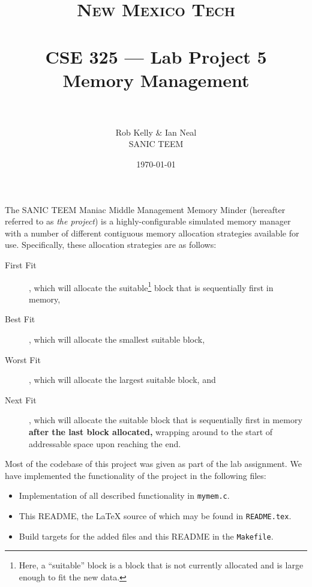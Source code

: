 \documentclass[paper=a4, fontsize=11pt]{scrartcl}
\title{
  \normalfont \normalsize 
  \textsc{New Mexico Tech} \\ [25pt]
  \horrule{0.5pt} \\[0.4cm]
  \huge CSE 325 --- Lab Project 5 \\ Memory Management \\
  \horrule{2pt} \\[0.5cm]
}
\author{Rob Kelly \& Ian Neal \\ SANIC TEEM}
\date{\normalsize\today}
\begin{document}
\maketitle

The SANIC TEEM Maniac Middle Management Memory Minder (hereafter referred to as \textit{the project}) is a highly-configurable simulated memory manager with a number of different contiguous memory allocation strategies available for use. Specifically, these allocation strategies are as follows:

\begin{description}
  \item[First Fit], which will allocate the suitable\footnote{Here, a ``suitable'' block is a block that is not currently allocated and is large enough to fit the new data.} block that is sequentially first in memory,

  \item[Best Fit], which will allocate the smallest suitable block,

  \item[Worst Fit], which will allocate the largest suitable block, and

  \item[Next Fit], which will allocate the suitable block that is sequentially first in memory \textbf{after the last block allocated,} wrapping around to the start of addressable space upon reaching the end.
\end{description}

Most of the codebase of this project was given as part of the lab assignment. We have implemented the functionality of the project in the following files:

\begin{itemize}
  \item Implementation of all described functionality in \texttt{mymem.c}.

  \item This README, the \LaTeX\hspace{0em} source of which may be found in \texttt{README.tex}.

  \item Build targets for the added files and this README in the \texttt{Makefile}.
\end{itemize}

\end{document}
